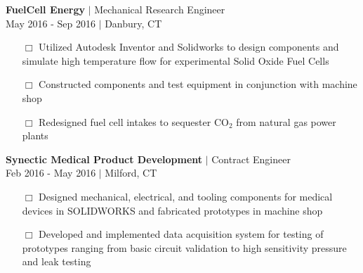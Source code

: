 \documentclass[10pt]{article}
\begin{document}
\begin{minipage}[t]{0.67\textwidth}
\textbf{FuelCell Energy} $\vert$ {\sc Mechanical Research Engineer}\\
{\color{gray} May 2016 - Sep 2016 $\vert$ Danbury, CT }\\[-.4cm]
\begin{itemize}
\small
\item[\tiny $\Box$] Utilized Autodesk Inventor and {\sc Solidworks} to design components and simulate high temperature flow for experimental Solid Oxide Fuel Cells
\item[\tiny $\Box$] Constructed components and test equipment in conjunction with machine shop 
\item[\tiny $\Box$] Redesigned fuel cell intakes to sequester CO$_2$ from natural gas power plants \\
\end{itemize}

\textbf{Synectic Medical Product Development} $\vert$ {\sc Contract Engineer}\\
{\color{gray} Feb 2016 - May 2016 $\vert$ Milford, CT }\\[-.4cm]
\begin{itemize}
\small
\item[\tiny $\Box$] Designed mechanical, electrical, and tooling components for medical devices in SOLIDWORKS and fabricated prototypes in machine shop
\item[\tiny $\Box$] Developed and implemented data acquisition system for testing of prototypes ranging from basic circuit validation to high sensitivity pressure and leak testing  \\
\end{itemize}


\end{minipage}
\end{document}
